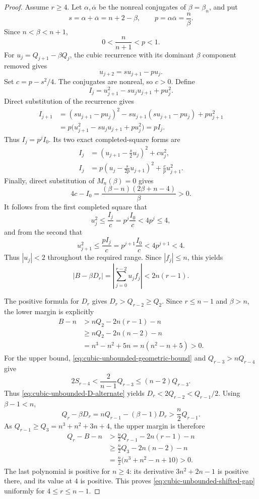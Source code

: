 \begin{proof}
Assume $r\ge4$.  Let $\alpha,\overline\alpha$ be the nonreal conjugates
of $\beta=\beta_n$, and put
\[
s=\alpha+\overline\alpha=n+2-\beta,
\qquad p=\alpha\overline\alpha=\frac n\beta.
\]
Since $n<\beta<n+1$,
\begin{equation}
0<\frac{n}{n+1}<p<1.
\label{eq:cubic-unbounded-p-range}
\end{equation}
For $u_j=Q_{j+1}-\beta Q_j$, the cubic recurrence with its dominant
$\beta$ component removed gives
\[
u_{j+2}=su_{j+1}-pu_j.
\]
Set $c=p-s^2/4$.  The conjugates are nonreal, so $c>0$.  Define
\[
I_j=u_{j+1}^2-su_ju_{j+1}+pu_j^2.
\]
Direct substitution of the recurrence gives
\begin{align*}
I_{j+1}
&=(su_{j+1}-pu_j)^2
  -su_{j+1}(su_{j+1}-pu_j)+pu_{j+1}^2\\
&=p\bigl(u_{j+1}^2-su_ju_{j+1}+pu_j^2\bigr)
=pI_j.
\end{align*}
Thus $I_j=p^jI_0$.  Its two exact completed-square forms are
\begin{align*}
I_j&=\left(u_{j+1}-\frac{s}{2}u_j\right)^2
 +cu_j^2,\\
I_j&=p\left(u_j-\frac{s}{2p}u_{j+1}\right)^2
 +\frac{c}{p}u_{j+1}^2.
\end{align*}
Finally, direct substitution of $M_n(\beta)=0$ gives
\[
4c-I_0
=\frac{(\beta-n)(2\beta+n-4)}{\beta}>0.
\]
It follows from the first completed square that
\[
u_j^2\le\frac{I_j}{c}=p^j\frac{I_0}{c}<4p^j\le4,
\]
and from the second that
\[
u_{j+1}^2\le\frac{pI_j}{c}
=p^{j+1}\frac{I_0}{c}<4p^{j+1}<4.
\]
Thus $|u_j|<2$ throughout the required range.  Since
$|f_j|\le n$, this yields
\begin{equation}
|B-\beta D_r|
=\left|\sum_{j=0}^{r-2}u_jf_j\right|<2n(r-1).
\label{eq:cubic-unbounded-conjugate-error}
\end{equation}

The positive formula for $D_r$ gives $D_r>Q_{r-2}\ge Q_2$.  Since
$r\le n-1$ and $\beta>n$, the lower margin is explicitly
\begin{align*}
B-n
&>nQ_2-2n(r-1)-n\\
&\ge nQ_2-2n(n-2)-n\\
&=n^3-n^2+5n
=n(n^2-n+5)>0.
\end{align*}
For the upper bound, \eqref{eq:cubic-unbounded-geometric-bound} and
$Q_{r-3}>nQ_{r-4}$ give
\[
2S_{r-4}<\frac{2}{n-1}Q_{r-3}
\le(n-2)Q_{r-3}.
\]
Thus \eqref{eq:cubic-unbounded-D-alternate} yields
$D_r<2Q_{r-2}<Q_{r-1}/2$.  Using $\beta-1<n$,
\[
Q_r-\beta D_r
=nQ_{r-1}-(\beta-1)D_r
>\frac n2Q_{r-1}.
\]
As $Q_{r-1}\ge Q_3=n^3+n^2+3n+4$, the upper margin is therefore
\begin{align*}
Q_r-B-n
&>\frac n2Q_{r-1}-2n(r-1)-n\\
&\ge\frac n2Q_3-2n(n-2)-n\\
&=\frac n2\bigl(n^3+n^2-n+10\bigr)>0.
\end{align*}
The last polynomial is positive for $n\ge4$: its derivative
$3n^2+2n-1$ is positive there, and its value at $4$ is positive.
This proves \eqref{eq:cubic-unbounded-shifted-gap} uniformly for
$4\le r\le n-1$.


\end{proof}
